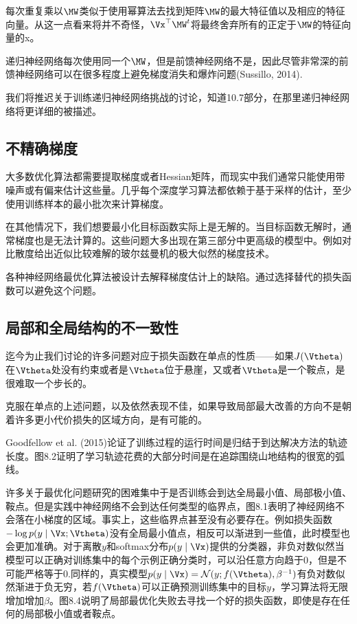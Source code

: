 每次重复乘以$\MW$类似于使用幂算法去找到矩阵$\MW$的最大特征值以及相应的特征向量。从这一点看来将并不奇怪，$\Vx^\top\MW^t$将最终舍弃所有的正定于$\MW$的特征向量的x。

递归神经网络每次使用同一个$\MW$，但是前馈神经网络不是，因此尽管非常深的前馈神经网络可以在很多程度上避免梯度消失和爆炸问题(Sussillo, 2014).

我们将推迟关于训练递归神经网络挑战的讨论，知道10.7部分，在那里递归神经网络将更详细的被描述。

\subsection{不精确梯度}
大多数优化算法都需要提取梯度或者Hessian矩阵，而现实中我们通常只能使用带噪声或有偏来估计这些量。几乎每个深度学习算法都依赖于基于采样的估计，至少使用训练样本的最小批次来计算梯度。

在其他情况下，我们想要最小化目标函数实际上是无解的。当目标函数无解时，通常梯度也是无法计算的。这些问题大多出现在第三部分中更高级的模型中。例如对比散度给出近似比较难解的玻尔兹曼机的极大似然的梯度技术。

各种神经网络最优化算法被设计去解释梯度估计上的缺陷。通过选择替代的损失函数可以避免这个问题。

\subsection{局部和全局结构的不一致性}
迄今为止我们讨论的许多问题对应于损失函数在单点的性质——如果$J(\Vtheta)$在$\Vtheta$处没有约束或者是$\Vtheta$位于悬崖，又或者$\Vtheta$是一个鞍点，是很难取一个步长的。

克服在单点的上述问题，以及依然表现不佳，如果导致局部最大改善的方向不是朝着许多更小代价损失的区域方向，是有可能的。

Goodfellow et al. (2015)论证了训练过程的运行时间是归结于到达解决方法的轨迹长度。图8.2证明了学习轨迹花费的大部分时间是在追踪围绕山地结构的很宽的弧线。

许多关于最优化问题研究的困难集中于是否训练会到达全局最小值、局部极小值、鞍点。但是实践中神经网络不会到达任何类型的临界点，图8.1表明了神经网络不会落在小梯度的区域。事实上，这些临界点甚至没有必要存在。例如损失函数$-\log p(y\mid\Vx;\Vtheta)$没有全局最小值点，相反可以渐进到一些值，此时模型也会更加准确。对于离散$y$和softmax分布$p(y\mid\Vx)$提供的分类器，非负对数似然当模型可以正确对训练集中的每个示例正确分类时，可以沿任意方向趋于0，但是不可能严格等于0.同样的，真实模型$p(y\mid\Vx) = \mathcal{N}(y;f(\Vtheta),\beta^{-1})$有负对数似然渐进于负无穷，若$f(\Vtheta)$可以正确预测训练集中的目标$y$，学习算法将无限增加增加$\beta$。图8.4说明了局部最优化失败去寻找一个好的损失函数，即使是存在任何的局部极小值或者鞍点。

